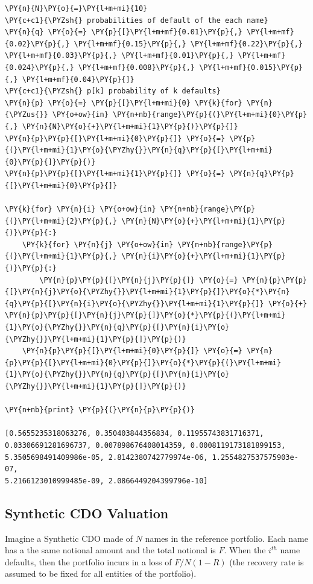 \begin{tcolorbox}[breakable, size=fbox, boxrule=1pt, pad at break*=1mm,colback=cellbackground, colframe=cellborder]
\begin{Verbatim}[commandchars=\\\{\}]
\PY{n}{N}\PY{o}{=}\PY{l+m+mi}{10}
\PY{c+c1}{\PYZsh{} probabilities of default of the each name}
\PY{n}{q} \PY{o}{=} \PY{p}{[}\PY{l+m+mf}{0.01}\PY{p}{,} \PY{l+m+mf}{0.02}\PY{p}{,} \PY{l+m+mf}{0.15}\PY{p}{,} \PY{l+m+mf}{0.22}\PY{p}{,} \PY{l+m+mf}{0.03}\PY{p}{,} \PY{l+m+mf}{0.01}\PY{p}{,} \PY{l+m+mf}{0.024}\PY{p}{,} \PY{l+m+mf}{0.008}\PY{p}{,} \PY{l+m+mf}{0.015}\PY{p}{,} \PY{l+m+mf}{0.04}\PY{p}{]}
\PY{c+c1}{\PYZsh{} p[k] probability of k defaults}
\PY{n}{p} \PY{o}{=} \PY{p}{[}\PY{l+m+mi}{0} \PY{k}{for} \PY{n}{\PYZus{}} \PY{o+ow}{in} \PY{n+nb}{range}\PY{p}{(}\PY{l+m+mi}{0}\PY{p}{,} \PY{n}{N}\PY{o}{+}\PY{l+m+mi}{1}\PY{p}{)}\PY{p}{]}
\PY{n}{p}\PY{p}{[}\PY{l+m+mi}{0}\PY{p}{]} \PY{o}{=} \PY{p}{(}\PY{l+m+mi}{1}\PY{o}{\PYZhy{}}\PY{n}{q}\PY{p}{[}\PY{l+m+mi}{0}\PY{p}{]}\PY{p}{)}
\PY{n}{p}\PY{p}{[}\PY{l+m+mi}{1}\PY{p}{]} \PY{o}{=} \PY{n}{q}\PY{p}{[}\PY{l+m+mi}{0}\PY{p}{]}
		
\PY{k}{for} \PY{n}{i} \PY{o+ow}{in} \PY{n+nb}{range}\PY{p}{(}\PY{l+m+mi}{2}\PY{p}{,} \PY{n}{N}\PY{o}{+}\PY{l+m+mi}{1}\PY{p}{)}\PY{p}{:}
    \PY{k}{for} \PY{n}{j} \PY{o+ow}{in} \PY{n+nb}{range}\PY{p}{(}\PY{l+m+mi}{1}\PY{p}{,} \PY{n}{i}\PY{o}{+}\PY{l+m+mi}{1}\PY{p}{)}\PY{p}{:}
        \PY{n}{p}\PY{p}{[}\PY{n}{j}\PY{p}{]} \PY{o}{=} \PY{n}{p}\PY{p}{[}\PY{n}{j}\PY{o}{\PYZhy{}}\PY{l+m+mi}{1}\PY{p}{]}\PY{o}{*}\PY{n}{q}\PY{p}{[}\PY{n}{i}\PY{o}{\PYZhy{}}\PY{l+m+mi}{1}\PY{p}{]} \PY{o}{+} \PY{n}{p}\PY{p}{[}\PY{n}{j}\PY{p}{]}\PY{o}{*}\PY{p}{(}\PY{l+m+mi}{1}\PY{o}{\PYZhy{}}\PY{n}{q}\PY{p}{[}\PY{n}{i}\PY{o}{\PYZhy{}}\PY{l+m+mi}{1}\PY{p}{]}\PY{p}{)}
    \PY{n}{p}\PY{p}{[}\PY{l+m+mi}{0}\PY{p}{]} \PY{o}{=} \PY{n}{p}\PY{p}{[}\PY{l+m+mi}{0}\PY{p}{]}\PY{o}{*}\PY{p}{(}\PY{l+m+mi}{1}\PY{o}{\PYZhy{}}\PY{n}{q}\PY{p}{[}\PY{n}{i}\PY{o}{\PYZhy{}}\PY{l+m+mi}{1}\PY{p}{]}\PY{p}{)}
		
\PY{n+nb}{print} \PY{p}{(}\PY{n}{p}\PY{p}{)}

[0.5655235318063276, 0.350403844356834, 0.11955743831716371,
0.03306691281696737, 0.007898676408014359, 0.0008119173181899153,
5.3505698491409986e-05, 2.8142380742779974e-06, 1.2554827537575903e-07,
5.2166123010999485e-09, 2.0866449204399796e-10]
\end{Verbatim}
\end{tcolorbox}

\subsection{Synthetic CDO Valuation}
Imagine a Synthetic CDO made of $N$ names in the reference portfolio. Each name has a the same notional amount and the total notional is $F$.
When the $i^{th}$ name defaults, then the portfolio incurs in a loss of $F/N(1-R)$ (the recovery rate is assumed to be fixed for all entities of the portfolio).

